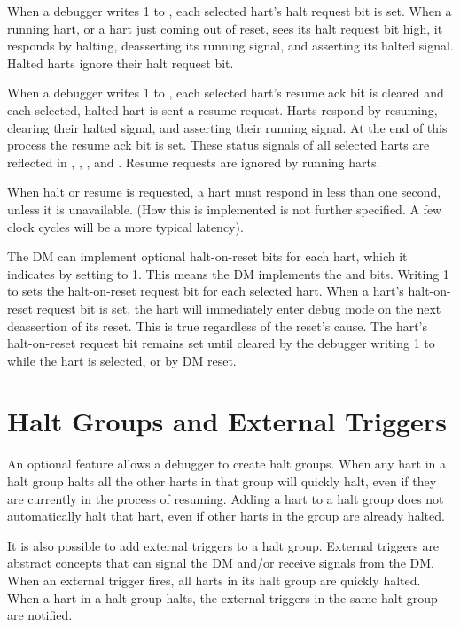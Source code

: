 When a debugger writes 1 to \Fhaltreq, each selected hart's halt request bit is
set.
When a running hart, or a hart just coming out of reset, sees its halt request
bit high, it responds by halting, deasserting its running signal, and asserting
its halted signal.
Halted harts ignore their halt request bit.

When a debugger writes 1 to \Fresumereq, each selected hart's resume ack bit is
cleared and each selected, halted hart is sent a resume request. Harts respond
by resuming, clearing their halted signal, and asserting their running signal.
At the end of this process the resume ack bit is set.  These
status signals of all selected harts are reflected in \Fallresumeack,
\Fanyresumeack, \Fallrunning, and \Fanyrunning. Resume requests are ignored by
running harts.

When halt or resume is requested, a hart must respond in
less than one second, unless it is unavailable.
(How this is implemented is not further specified. A few
clock cycles will be a more typical latency).

The DM can implement optional halt-on-reset bits for each hart,
which it indicates by setting \Fhasresethaltreq to 1.
This means the DM implements the \Fsetresethaltreq and \Fclrresethaltreq bits.
Writing 1 to \Fsetresethaltreq sets the halt-on-reset request bit for each
selected hart.
When a hart's halt-on-reset request bit is set, the hart will immediately enter
debug mode on the next deassertion of its reset. This is true regardless of
the reset's cause.
The hart's halt-on-reset request bit remains set
until cleared by the debugger writing 1 to \Fclrresethaltreq
while the hart is selected, or by DM reset.

\section{Halt Groups and External Triggers}

An optional feature allows a debugger to create halt groups. When any hart in a
halt group halts all the other harts in that group will quickly halt, even if
they are currently in the process of resuming. Adding a hart to a halt group
does not automatically halt that hart, even if other harts in the group are
already halted.

It is also possible to add external triggers to a halt group. External triggers
are abstract concepts that can signal the DM and/or receive signals from the
DM.  When an external trigger fires, all harts in its halt group are quickly
halted. When a hart in a halt group halts, the external triggers in the same
halt group are notified.

